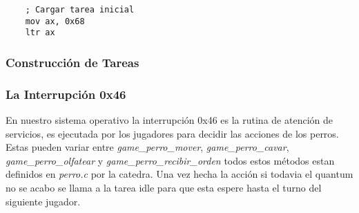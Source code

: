 \begin{lstlisting}
	; Cargar tarea inicial
	mov ax, 0x68
	ltr ax
\end{lstlisting}

\subsubsection{Construcción de Tareas}


\subsubsection{La Interrupción 0x46}
En nuestro sistema operativo la interrupción 0x46 es la rutina de atención de servicios, es ejecutada por los jugadores para decidir las acciones de los perros. Estas pueden variar entre  \textit{game\_perro\_mover}, \textit{game\_perro\_cavar}, \textit{game\_perro\_olfatear} y \textit{game\_perro\_recibir\_orden} todos estos métodos estan definidos en \textit{perro.c} por la catedra. Una vez hecha la acción si todavia el quantum no se acabo se llama a la tarea idle para que esta espere hasta el turno del siguiente jugador.